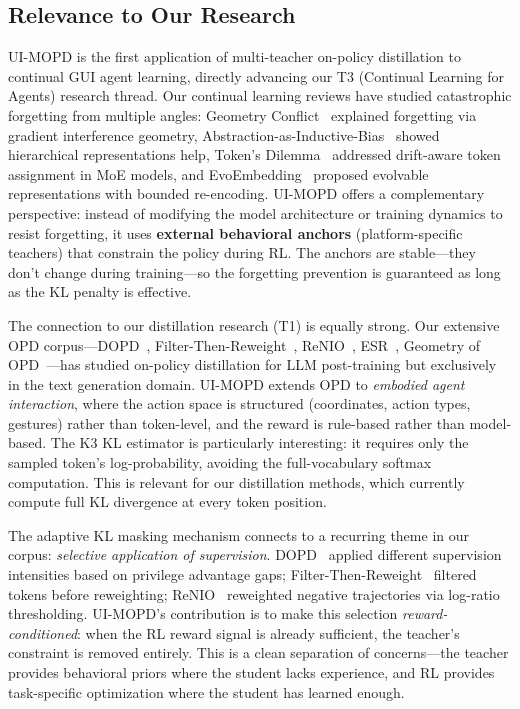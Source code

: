 \documentclass[11pt,a4paper]{article}
\begin{document}
\subsection{Relevance to Our Research}

UI-MOPD is the first application of multi-teacher on-policy distillation to continual GUI agent learning, directly advancing our T3 (Continual Learning for Agents) research thread. Our continual learning reviews have studied catastrophic forgetting from multiple angles: Geometry Conflict~\cite{geomconflict2026} explained forgetting via gradient interference geometry, Abstraction-as-Inductive-Bias~\cite{abstraction2026} showed hierarchical representations help, Token's Dilemma~\cite{tokensdilemma2026} addressed drift-aware token assignment in MoE models, and EvoEmbedding~\cite{evoembedding2026} proposed evolvable representations with bounded re-encoding. UI-MOPD offers a complementary perspective: instead of modifying the model architecture or training dynamics to resist forgetting, it uses \textbf{external behavioral anchors} (platform-specific teachers) that constrain the policy during RL. The anchors are stable---they don't change during training---so the forgetting prevention is guaranteed as long as the KL penalty is effective.

The connection to our distillation research (T1) is equally strong. Our extensive OPD corpus---DOPD~\cite{dopd2026}, Filter-Then-Reweight~\cite{ftr2026}, ReNIO~\cite{renio2026}, ESR~\cite{esr2026}, Geometry of OPD~\cite{geopd2026}---has studied on-policy distillation for LLM post-training but exclusively in the text generation domain. UI-MOPD extends OPD to \emph{embodied agent interaction}, where the action space is structured (coordinates, action types, gestures) rather than token-level, and the reward is rule-based rather than model-based. The K3 KL estimator is particularly interesting: it requires only the sampled token's log-probability, avoiding the full-vocabulary softmax computation. This is relevant for our distillation methods, which currently compute full KL divergence at every token position.

The adaptive KL masking mechanism connects to a recurring theme in our corpus: \emph{selective application of supervision}. DOPD~\cite{dopd2026} applied different supervision intensities based on privilege advantage gaps; Filter-Then-Reweight~\cite{ftr2026} filtered tokens before reweighting; ReNIO~\cite{renio2026} reweighted negative trajectories via log-ratio thresholding. UI-MOPD's contribution is to make this selection \emph{reward-conditioned}: when the RL reward signal is already sufficient, the teacher's constraint is removed entirely. This is a clean separation of concerns---the teacher provides behavioral priors where the student lacks experience, and RL provides task-specific optimization where the student has learned enough.
\end{document}
